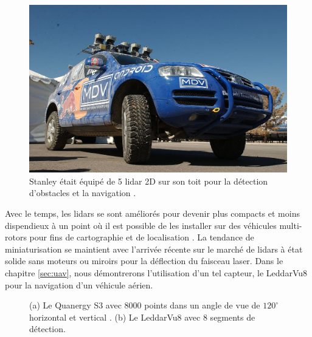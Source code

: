 \begin{figure}[ht]
  \centering
  \includegraphics[width=0.5\linewidth]{images/stanley.jpg}
  \caption[Stanley la voiture autonome fonctionnant par lidar.]{Stanley était équipé de 5 lidar 2D sur son toit pour la détection d'obstacles et la navigation \citep{thrun2006stanley}.}
  \label{fig:stanley}
\end{figure}

Avec le temps, les lidars se sont améliorés pour devenir plus compacts et moins dispendieux à un point où il est possible de les installer sur des véhicules multi-rotors pour fins de cartographie et de localisation \citep{zhang2018aerial}. La tendance de miniaturisation se maintient avec l'arrivée récente sur le marché de lidars à état solide sans moteurs ou miroirs pour la déflection du faisceau laser. Dans le chapitre \ref{sec:uav}, nous démontrerons l'utilisation d'un tel capteur, le LeddarVu8 pour la navigation d'un véhicule aérien.

\pagebreak
\begin{figure}[!h]
  \centering
  \caption[Lidars à état solide]{
    (a) Le Quanergy S3 avec $8000$ points dans un angle de vue de $120^\circ$ horizontal et vertical \citep{eldada2016}.
    (b) Le LeddarVu8 avec $8$ segments de détection.
  }
  \label{fig:lidars}
\end{figure}
